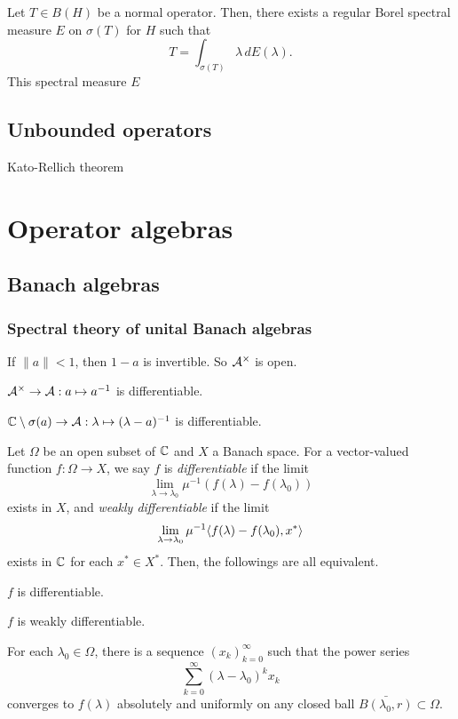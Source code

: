 \documentclass{../note}
\begin{document}
Let $T\in B(H)$ be a normal operator.
Then, there exists a regular Borel spectral measure $E$ on $\sigma(T)$ for $H$ such that
\[T=\int_{\sigma(T)}\lambda\,dE(\lambda).\]
This spectral measure $E$




\chapter{Unbounded operators}



Kato-Rellich theorem











\part{Operator algebras}
\chapter{Banach algebras}

\section{Spectral theory of unital Banach algebras}

\begin{prb}
\begin{parts}
\item If $\|a\|<1$, then $1-a$ is invertible. So $\mathcal{A}^\times$ is open.
\item $\mathcal{A}^\times\to\mathcal{A}:a\mapsto a^{-1}$ is differentiable.
\item $\mathbb{C}\setminus\sigma(a)\to\mathcal{A}:\lambda\mapsto(\lambda-a)^{-1}$ is differentiable.
\end{parts}
\end{prb}

\begin{prb}
Let $\Omega$ be an open subset of $\mathbb{C}$ and $X$ a Banach space.
For a vector-valued function $f:\Omega\to X$, we say $f$ is \emph{differentiable} if the limit
\[\lim_{\lambda\to\lambda_0}\mu^{-1}(f(\lambda)-f(\lambda_0))\]
exists in $X$, and \emph{weakly differentiable} if the limit
\[\lim_{\lambda\to\lambda_0}\mu^{-1}\langle f(\lambda)-f(\lambda_0),x^*\rangle\]
exists in $\mathbb{C}$ for each $x^*\in X^*$.
Then, the followings are all equivalent.
\begin{parts}
\item $f$ is differentiable.
\item $f$ is weakly differentiable.
\item For each $\lambda_0\in\Omega$, there is a sequence $(x_k)_{k=0}^\infty$ such that the power series
\[\sum_{k=0}^\infty(\lambda-\lambda_0)^kx_k\]
converges to $f(\lambda)$ absolutely and uniformly on any closed ball $\bar{B(\lambda_0,r)}\subset\Omega$.
\end{parts}
\end{prb}
\end{document}
